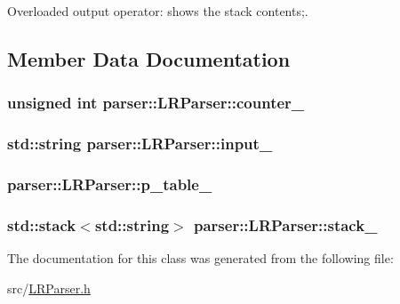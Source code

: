 \-Overloaded output operator\-: shows the stack contents;. 



\subsection{\-Member \-Data \-Documentation}
\hypertarget{classparser_1_1LRParser_accf01c8956117b364f88fba4cb17b15c}{
\subsubsection[{counter\-\_\-}]{\setlength{\rightskip}{0pt plus 5cm}unsigned int {\bf parser\-::\-L\-R\-Parser\-::counter\-\_\-}}}\label{d6/d50/classparser_1_1LRParser_accf01c8956117b364f88fba4cb17b15c}
\hypertarget{classparser_1_1LRParser_a7d693202c661afc170b2c5cc11667323}{
\subsubsection[{input\-\_\-}]{\setlength{\rightskip}{0pt plus 5cm}std\-::string {\bf parser\-::\-L\-R\-Parser\-::input\-\_\-}}}\label{d6/d50/classparser_1_1LRParser_a7d693202c661afc170b2c5cc11667323}
\hypertarget{classparser_1_1LRParser_a2d47acce2ed64522ddd4011295412e72}{
\subsubsection[{p\-\_\-table\-\_\-}]{ {\bf parser\-::\-L\-R\-Parser\-::p\-\_\-table\-\_\-}}}\label{d6/d50/classparser_1_1LRParser_a2d47acce2ed64522ddd4011295412e72}
\hypertarget{classparser_1_1LRParser_a6e3689c510e91dbc51a2bee92bf760da}{
\subsubsection[{stack\-\_\-}]{\setlength{\rightskip}{0pt plus 5cm}std\-::stack$<$std\-::string$>$ {\bf parser\-::\-L\-R\-Parser\-::stack\-\_\-}}}\label{d6/d50/classparser_1_1LRParser_a6e3689c510e91dbc51a2bee92bf760da}


\-The documentation for this class was generated from the following file\-:\begin{DoxyCompactItemize}
\item 
src/\hyperlink{LRParser_8h}{\-L\-R\-Parser.\-h}\end{DoxyCompactItemize}
